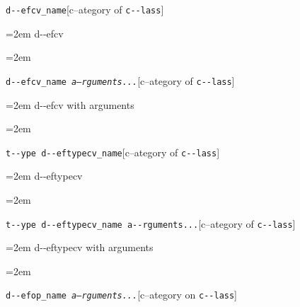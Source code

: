 \documentclass{book}
\begin{document}
\endgroup{}%
\noindent\texttt{d{-}{-}efcv\_name}\hfill[c--ategory of \texttt{c{-}{-}lass}]



%
\par\begingroup\obeylines\obeyspaces\frenchspacing\leftskip=2em\relax\parskip=0pt\relax\ttfamily{}%
d{-}{-}efcv
\endgroup{}%
\par\begingroup\obeylines\obeyspaces\frenchspacing\leftskip=2em\relax\parskip=0pt\relax\ttfamily{}%

\endgroup{}%
\noindent\texttt{d{-}{-}efcv\_name \EmbracOn{}\textnormal{\textsl{a--rguments...}}\EmbracOff{}}\hfill[c--ategory of \texttt{c{-}{-}lass}]



%
\par\begingroup\obeylines\obeyspaces\frenchspacing\leftskip=2em\relax\parskip=0pt\relax\ttfamily{}%
d{-}{-}efcv with arguments
\endgroup{}%
\par\begingroup\obeylines\obeyspaces\frenchspacing\leftskip=2em\relax\parskip=0pt\relax\ttfamily{}%

\endgroup{}%
\noindent\texttt{t{-}{-}ype d{-}{-}eftypecv\_name}\hfill[c--ategory of \texttt{c{-}{-}lass}]



%
\par\begingroup\obeylines\obeyspaces\frenchspacing\leftskip=2em\relax\parskip=0pt\relax\ttfamily{}%
d{-}{-}eftypecv
\endgroup{}%
\par\begingroup\obeylines\obeyspaces\frenchspacing\leftskip=2em\relax\parskip=0pt\relax\ttfamily{}%

\endgroup{}%
\noindent\texttt{t{-}{-}ype d{-}{-}eftypecv\_name a{-}{-}rguments...}\hfill[c--ategory of \texttt{c{-}{-}lass}]



%
\par\begingroup\obeylines\obeyspaces\frenchspacing\leftskip=2em\relax\parskip=0pt\relax\ttfamily{}%
d{-}{-}eftypecv with arguments
\endgroup{}%
\par\begingroup\obeylines\obeyspaces\frenchspacing\leftskip=2em\relax\parskip=0pt\relax\ttfamily{}%

\endgroup{}%
\noindent\texttt{d{-}{-}efop\_name \EmbracOn{}\textnormal{\textsl{a--rguments...}}\EmbracOff{}}\hfill[c--ategory on \texttt{c{-}{-}lass}]
\end{document}
